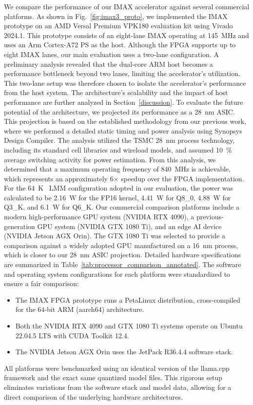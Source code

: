   
We compare the performance of our IMAX accelerator against several commercial platforms. 
As shown in Fig.~\ref{fig:imax3_proto}, we implemented the IMAX prototype on an AMD Versal Premium VPK180 evaluation kit using Vivado 2024.1. 
This prototype consists of an eight-lane IMAX operating at \SI{145}{\mega\hertz} and uses an Arm Cortex-A72 PS as the host.
Although the FPGA supports up to eight IMAX lanes, our main evaluation uses a two-lane configuration. 
A preliminary analysis revealed that the dual-core ARM host becomes a performance bottleneck beyond two lanes, limiting the accelerator's utilization. 
This two-lane setup was therefore chosen to isolate the accelerator's performance from the host system. 
The architecture's scalability and the impact of host performance are further analyzed in Section~\ref{discussion}.
To evaluate the future potential of the architecture, we projected its performance as a \SI{28}{\nano\meter} ASIC. 
This projection is based on the established methodology from our previous work\nobreak\cite{imax3}, where we performed a detailed static timing and power analysis using Synopsys Design Compiler\cite{SynopsysNDDCUltra}. 
The analysis utilized the TSMC \SI{28}{\nano\meter} process technology, including its standard cell libraries and wireload models, and assumed \SI{10}{\percent} average switching activity for power estimation. 
From this analysis, we determined that a maximum operating frequency of \SI{840}{\mega\hertz} is achievable, which represents an approximately \num{6}$\times$ speedup over the FPGA implementation.
For the \SI{64}{K\byte} LMM configuration adopted in our evaluation, the power was calculated to be \SI{2.16}{\watt} for the FP16 kernel, \SI{4.41}{\watt} for Q8\_0, \SI{4.88}{\watt} for Q3\_K, and \SI{6.1}{\watt} for Q6\_K. 
Our commercial comparison platforms include a modern high-performance GPU system (NVIDIA RTX 4090), a previous-generation GPU system (NVIDIA GTX 1080 Ti), and an edge AI device (NVIDIA Jetson AGX Orin). 
The GTX 1080 Ti was selected to provide a comparison against a widely adopted GPU manufactured on a \SI{16}{\nano\meter} process, which is closer to our \SI{28}{\nano\meter} ASIC projection. 
Detailed hardware specifications are summarized in Table~\ref{tab:processor_comparison_annotated}.
The software and operating system configurations for each platform were standardized to ensure a fair comparison:
\begin{itemize}
\item The IMAX FPGA prototype runs a PetaLinux distribution, cross-compiled for the 64-bit ARM (aarch64) architecture.
\item Both the NVIDIA RTX 4090 and GTX 1080 Ti systems operate on Ubuntu 22.04.5 LTS with CUDA Toolkit 12.4.
\item The NVIDIA Jetson AGX Orin uses the JetPack R36.4.4 software stack.
\end{itemize}
All platforms were benchmarked using an identical version of the llama.cpp framework and the exact same quantized model files. 
This rigorous setup eliminates variations from the software stack and model data, allowing for a direct comparison of the underlying hardware architectures. 


